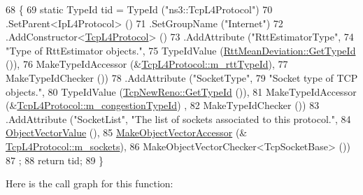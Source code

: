\begin{DoxyCode}
68 \{
69   \textcolor{keyword}{static} TypeId tid = TypeId (\textcolor{stringliteral}{"ns3::TcpL4Protocol"})
70     .SetParent<IpL4Protocol> ()
71     .SetGroupName (\textcolor{stringliteral}{"Internet"})
72     .AddConstructor<\hyperlink{classns3_1_1TcpL4Protocol_a56aa36e10a43fbdc7b0765562498fa10}{TcpL4Protocol}> ()
73     .AddAttribute (\textcolor{stringliteral}{"RttEstimatorType"},
74                    \textcolor{stringliteral}{"Type of RttEstimator objects."},
75                    TypeIdValue (\hyperlink{classns3_1_1RttMeanDeviation_a23fc3e702e6d7290bf5fcd53d36e0aa2}{RttMeanDeviation::GetTypeId} ()),
76                    MakeTypeIdAccessor (&\hyperlink{classns3_1_1TcpL4Protocol_aff3e46318717dcbce5f222e94b8345cd}{TcpL4Protocol::m\_rttTypeId}),
77                    MakeTypeIdChecker ())
78     .AddAttribute (\textcolor{stringliteral}{"SocketType"},
79                    \textcolor{stringliteral}{"Socket type of TCP objects."},
80                    TypeIdValue (\hyperlink{classns3_1_1TcpNewReno_af4f4778f724f72a8a441ac0af4cdd8fe}{TcpNewReno::GetTypeId} ()),
81                    MakeTypeIdAccessor (&\hyperlink{classns3_1_1TcpL4Protocol_a2c724fd042748420d8a8df49e7ef28d7}{TcpL4Protocol::m\_congestionTypeId})
      ,
82                    MakeTypeIdChecker ())
83     .AddAttribute (\textcolor{stringliteral}{"SocketList"}, \textcolor{stringliteral}{"The list of sockets associated to this protocol."},
84                    \hyperlink{namespacens3_a5de726d8bcea7a51fd68ce5167a66713}{ObjectVectorValue} (),
85                    \hyperlink{namespacens3_a6ad5b3621a5dc72b7030cbb07c73adf6}{MakeObjectVectorAccessor} (&
      \hyperlink{classns3_1_1TcpL4Protocol_a7f0bde5144a1bb7594e4cf366669bcbc}{TcpL4Protocol::m\_sockets}),
86                    MakeObjectVectorChecker<TcpSocketBase> ())
87   ;
88   \textcolor{keywordflow}{return} tid;
89 \}
\end{DoxyCode}


Here is the call graph for this function\+:



